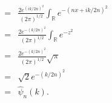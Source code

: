 \documentclass{article}
\begin{document}
\begin{enumerate}
\begin{enumerate}
$$\begin{aligned}
					\\
					= & \frac{2e^{(ik/2n)^{2}} }{(2\pi)^{1/2}}\int_{\mathbb{R}} e^{-(nx + ik/2n)^{2} }
					\\
					= & \frac{2e^{-(k/2n)^{2}} }{(2\pi)^{1/2}}\int_{\mathbb{R}} e^{-z^{2} }
					\\
					= & \frac{2 e^{-(k/2n)^{2}} }{(2\pi)^{1/2}} \sqrt{\pi}
					\\
					= & \sqrt{2} e^{-(k/2n)^{2}}
					\\
					= & \hat{\psi}_{n}(k). 
					\end{aligned}
					$$
			\end{enumerate}
	\end{enumerate}
	
	
\end{document}

